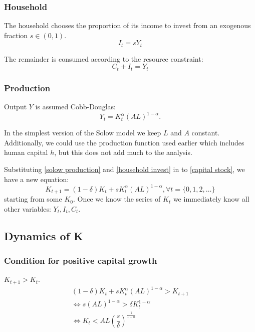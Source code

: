 \documentclass[11pt]{article}
\begin{document}
\subsubsection*{Household}

The household chooses the proportion of its income to invest from an exogenous fraction $s\in(0,1)$.
\begin{equation}
    \label{household invest}
    I_t = sY_t
\end{equation}

The remainder is consumed according to the resource constraint:
\begin{equation}
    \label{constraint}
    C_t + I_t = Y_t
\end{equation}

\subsubsection*{Production}
Output $Y$ is assumed Cobb-Douglas:
\begin{equation}
    \label{solow production}
    Y_t = K_t^\alpha(AL)^{1-\alpha}.
\end{equation}

\begin{note}
    In the simplest version of the Solow model we keep $L$ and $A$ constant. Additionally, we could use the production function used earlier which includes human capital $h$, but this does not add much to the analysis.
\end{note}

Substituting \eqref{solow production} and \eqref{household invest} in to \eqref{capital stock}, we have a new equation:
\begin{equation}
    K_{t+1} = (1-\delta)K_t + sK_t^\alpha(AL)^{1-\alpha}, \forall t = \{0,1,2,\ldots\}
\end{equation}
starting from some $K_0$. Once we know the series of $K_t$ we immediately know all other variables: $Y_t, I_t, C_t$.

\subsection{Dynamics of K}

\subsubsection{Condition for positive capital growth}
$K_{t+1} > K_t$.
\begin{equation}
    \label{capital growth}
\end{equation}
\begin{gather*}
     (1-\delta)K_t + sK_t^\alpha(AL)^{1-\alpha} > K_{t+1} \\
     \Leftrightarrow s(AL)^{1-\alpha} > \delta K_t^{1-\alpha} \\
     \Leftrightarrow K_t < AL\left( \dfrac{s}{\delta}\right)^{\frac{1}{1-\alpha}}
\end{gather*}
\end{document}
